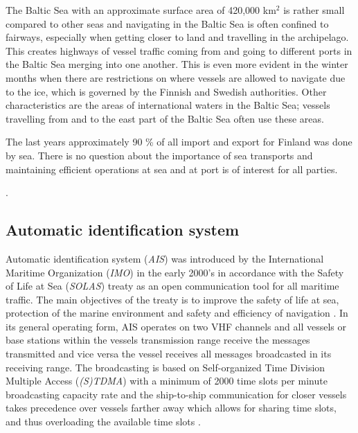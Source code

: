 \documentclass[../main.tex]{subfiles}
\begin{document}
The Baltic Sea with an approximate surface area of 420,000 km$^2$ is rather small compared to other seas and navigating in the Baltic Sea is often confined to fairways, especially when getting closer to land and travelling in the archipelago. This creates highways of vessel traffic coming from and going to different ports in the Baltic Sea merging into one another. This is even more evident in the winter months when there are restrictions on where vessels are allowed to navigate due to the ice, which is governed by the Finnish and Swedish authorities. Other characteristics are the areas of international waters in the Baltic Sea; vessels travelling from and to the east part of the Baltic Sea often use these areas. 

The last years approximately 90 \% of all import and export for Finland was done by sea\cite{SVRY_2022}. There is no question about the importance of sea transports and maintaining efficient operations at sea and at port is of interest for all parties.

\cite{SVRY_2022, TRAFICOM_2021}. 

\subsection{Automatic identification system}

Automatic identification system (\textit{AIS}) was introduced by the International Maritime Organization (\textit{IMO}) in the early 2000's in accordance with the Safety of Life at Sea (\textit{SOLAS}) treaty as an open communication tool for all maritime traffic. The main objectives of the treaty is to improve the safety of life at sea, protection of the marine environment and safety and efficiency of navigation \cite{IMO_2015}. In its general operating form, AIS operates on two VHF channels and all vessels or base stations within the vessels transmission range receive the messages transmitted and vice versa the vessel receives all messages broadcasted in its receiving range. The broadcasting is based on Self-organized Time Division Multiple Access (\textit{(S)TDMA}) with a minimum of 2000 time slots per minute broadcasting capacity rate and the ship-to-ship communication for closer vessels takes precedence over vessels farther away which allows for sharing time slots, and thus overloading the available time slots \cite{IMO_2015}.
\end{document}
